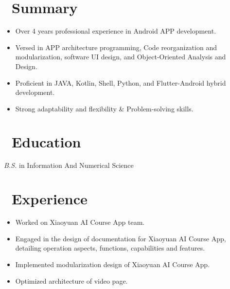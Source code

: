\documentclass{resume}
\begin{document}



\section{\faStarO\ Summary}
\begin{itemize}[parsep=0.5ex]
  \item Over 4 years professional experience in Android APP development.
  \item Versed in APP architecture programming, Code reorganization and modularization,
  software UI design, and Object-Oriented Analysis and Design.
  \item Proficient in JAVA, Kotlin, Shell, Python, and Flutter-Android hybrid development.
  \item Strong adaptability and flexibility \& Problem-solving skills.
\end{itemize}

\section{\faGraduationCap\ Education}
\textit{B.S.} in Information And Numerical Science

\section{\faUsers\ Experience}
\begin{itemize}
  \item Worked on Xiaoyuan AI Course App team.
  \item Engaged in the design of documentation for Xiaoyuan AI Course App, detailing operation aspects, functions, capabilities and features.
  \item Implemented modularization design of Xiaoyuan AI Course App.
  \item Optimized architecture of video page.
\end{itemize}
\end{document}
